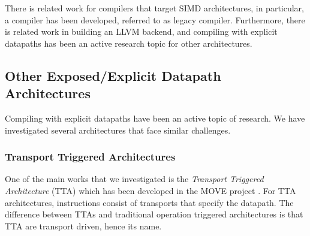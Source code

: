 



There is related work for compilers that target SIMD architectures, in particular, a compiler has been developed, referred to as legacy compiler. Furthermore, there is related work in building an LLVM backend, and compiling with explicit datapaths has been an active research topic for other architectures.


\subsection{Other Exposed/Explicit Datapath Architectures}\label{sec:other_explicit_datapaths}
Compiling with explicit datapaths have been an active topic of research. We have investigated several architectures that face similar challenges. 


\subsubsection{Transport Triggered Architectures}\label{sec:tta}
One of the main works that we investigated is the  \emph{Transport Triggered Architecture} (TTA) which has been developed in the MOVE project \cite{tta_codegen}. For TTA architectures, instructions consist of transports that specify the datapath. The difference between TTAs and traditional operation triggered architectures is that TTA are transport driven, hence its name. 

